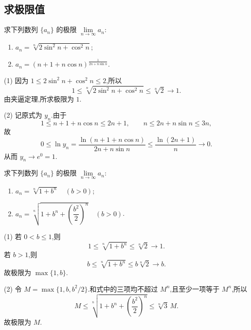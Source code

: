 \subsection{求极限值}



\begin{example}
  求下列数列 $\{a_n\}$ 的极限 $\displaystyle \lim\limits_{n\to\infty}a_n$:
  \begin{enumerate}
    \item $\displaystyle a_n=\sqrt[n]{2\sin^2n+\cos^2n}$;
    \item $\displaystyle a_n=(n+1+n\cos n)^{\frac{1}{2n+n\sin n}}$.
  \end{enumerate}
\end{example}
\exampleblank

\begin{solution}
  (1) 因为 $1\leq2\sin^2n+\cos^2n\leq2$,所以
  \[
    1\leq\sqrt[n]{2\sin^2n+\cos^2n}\leq\sqrt[n]{2}\longrightarrow1.
  \]
  由夹逼定理,所求极限为 $1$.

  (2) 记原式为 $y_n$.由于
  \[
    1\leq n+1+n\cos n\leq2n+1,
    \qquad
    n\leq2n+n\sin n\leq3n,
  \]
  故
  \[
    0\leq\ln y_n
    =\dfrac{\ln(n+1+n\cos n)}{2n+n\sin n}
    \leq\dfrac{\ln(2n+1)}{n}\longrightarrow0.
  \]
  从而 $y_n\to e^0=1$.
\end{solution}

\begin{example}
  求下列数列 $\{a_n\}$ 的极限 $\displaystyle \lim\limits_{n\to\infty}a_n$:
  \begin{enumerate}
    \item $\displaystyle a_n=\sqrt[n]{1+b^n}\quad(b>0)$;
    \item $\displaystyle a_n=\sqrt[n]{1+b^n+\left(\dfrac{b^2}{2}\right)^n}\quad(b>0)$.
  \end{enumerate}
\end{example}
\exampleblank

\begin{solution}
  (1) 若 $0<b\leq1$,则
  \[
    1\leq\sqrt[n]{1+b^n}\leq\sqrt[n]{2}\longrightarrow1.
  \]
  若 $b>1$,则
  \[
    b\leq\sqrt[n]{1+b^n}\leq b\sqrt[n]{2}\longrightarrow b.
  \]
  故极限为 $\max\{1,b\}$.

  (2) 令 $M=\max\{1,b,b^2/2\}$.和式中的三项均不超过 $M^n$,且至少一项等于
  $M^n$,所以
  \[
    M\leq\sqrt[n]{1+b^n+\left(\dfrac{b^2}{2}\right)^n}
    \leq\sqrt[n]{3}\,M.
  \]
  故极限为 $M$.
\end{solution}

